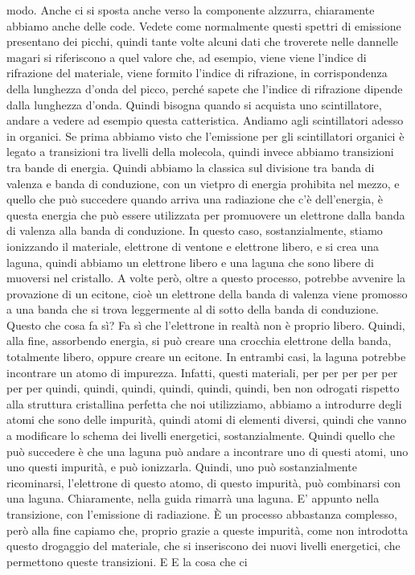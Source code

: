 {modo. Anche ci si sposta anche verso la componente alzzurra, chiaramente abbiamo anche delle code. Vedete come normalmente questi spettri di emissione presentano dei picchi, quindi tante volte alcuni dati che troverete nelle dannelle magari si riferiscono a quel valore che, ad esempio, viene viene l'indice di rifrazione del materiale, viene formito l'indice di rifrazione, in corrispondenza della lunghezza d'onda del picco, perché sapete che l'indice di rifrazione dipende dalla lunghezza d'onda. Quindi bisogna quando si acquista uno scintillatore, andare a vedere ad esempio questa catteristica. Andiamo agli scintillatori adesso in organici. Se prima abbiamo visto che l'emissione per gli scintillatori organici è legato a transizioni tra livelli della molecola, quindi invece abbiamo transizioni tra bande di energia. Quindi abbiamo la classica sul divisione tra banda di valenza e banda di conduzione, con un vietpro di energia prohibita nel mezzo, e quello che può succedere quando arriva una radiazione che c'è dell'energia, è questa energia che può essere utilizzata per promuovere un elettrone dalla banda di valenza alla banda di conduzione. In questo caso, sostanzialmente, stiamo ionizzando il materiale, elettrone di ventone e elettrone libero, e si crea una laguna, quindi abbiamo un elettrone libero e una laguna che sono libere di muoversi nel cristallo. A volte però, oltre a questo processo, potrebbe avvenire la provazione di un ecitone, cioè un elettrone della banda di valenza viene promosso a una banda che si trova leggermente al di sotto della banda di conduzione. Questo che cosa fa sì? Fa sì che l'elettrone in realtà non è proprio libero. Quindi, alla fine, assorbendo energia, si può creare una crocchia elettrone della banda, totalmente libero, oppure creare un ecitone. In entrambi casi, la laguna potrebbe incontrare un atomo di impurezza. Infatti, questi materiali, per per per per per per per quindi, quindi, quindi, quindi, quindi, quindi, ben non odrogati rispetto alla struttura cristallina perfetta che noi utilizziamo, abbiamo a introdurre degli atomi che sono delle impurità, quindi atomi di elementi diversi, quindi che vanno a modificare lo schema dei livelli energetici, sostanzialmente. Quindi quello che può succedere è che una laguna può andare a incontrare uno di questi atomi, uno uno questi impurità, e può ionizzarla. Quindi, uno può sostanzialmente ricominarsi, l'elettrone di questo atomo, di questo impurità, può combinarsi con una laguna. Chiaramente, nella guida rimarrà una laguna. E' appunto nella transizione, con l'emissione di radiazione. È un processo abbastanza complesso, però alla fine capiamo che, proprio grazie a queste impurità, come non introdotta questo drogaggio del materiale, che si inseriscono dei nuovi livelli energetici, che permettono queste transizioni. E E la cosa che ci 

}
